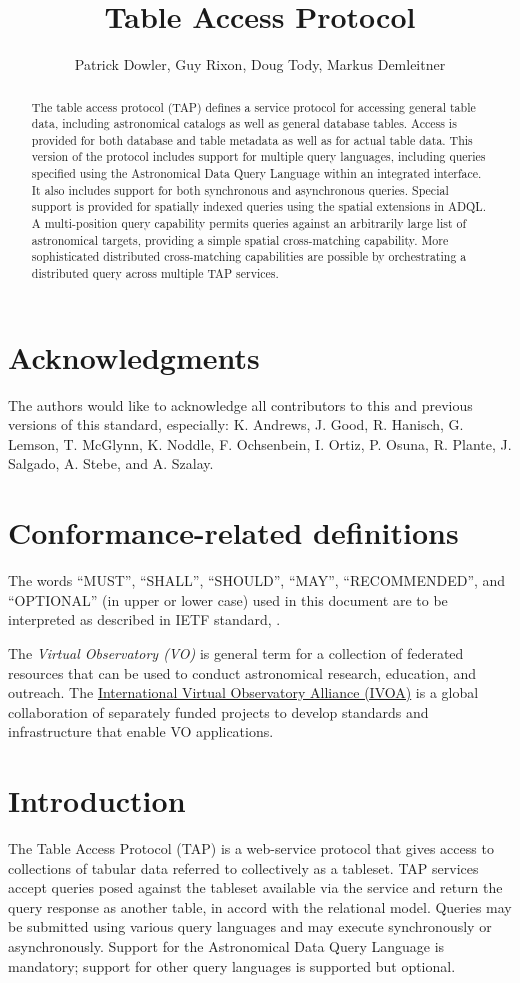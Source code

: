 \documentclass[11pt,letter]{ivoa}
\title{Table Access Protocol}
\author{Patrick Dowler, Guy Rixon, Doug Tody, Markus Demleitner}
\begin{document}
\begin{abstract}
The table access protocol (TAP) defines a service protocol for accessing general 
table data, including astronomical catalogs as well as general database tables. 
Access is provided for both database and table metadata as well as for actual 
table data. This version of the protocol includes support for multiple query 
languages, including queries specified using the Astronomical Data Query 
Language \citep{std:ADQL} within an integrated interface. It also includes 
support 
for both synchronous and asynchronous queries. Special support is provided for
spatially indexed queries using the spatial extensions in ADQL. A multi-position 
query capability permits queries against an arbitrarily large list of 
astronomical targets, providing a simple spatial cross-matching capability. 
More sophisticated distributed cross-matching capabilities are possible by 
orchestrating a distributed query across multiple TAP services.  
\end{abstract}


\section*{Acknowledgments}

The authors would like to acknowledge all contributors to this and previous 
versions of this standard, especially: K. Andrews, J. Good, R. Hanisch, G. 
Lemson, T. McGlynn, K. Noddle, F. Ochsenbein, I. Ortiz, P. Osuna, R. Plante, 
J. Salgado, A. Stebe, and A. Szalay.


\section*{Conformance-related definitions}

The words ``MUST'', ``SHALL'', ``SHOULD'', ``MAY'', ``RECOMMENDED'', and
``OPTIONAL'' (in upper or lower case) used in this document are to be
interpreted as described in IETF standard, \citet{std:RFC2119}.

The \emph{Virtual Observatory (VO)} is general term for a collection of 
federated resources that can be used to conduct astronomical research, 
education, and outreach. The \href{http://www.ivoa.net}{International
Virtual Observatory Alliance (IVOA)} is a global collaboration of separately 
funded projects to develop standards and infrastructure that enable VO 
applications.


\section{Introduction}
The Table Access Protocol (TAP) is a web-service protocol that gives access to 
collections of tabular data referred to collectively as a tableset.  TAP 
services accept queries posed against the tableset available via the service and 
return the query response as another table, in accord with the relational model. 
 Queries may be submitted using various query languages and may execute 
synchronously or asynchronously. Support for the Astronomical Data Query 
Language \citep{std:ADQL} is mandatory; support for other query languages is 
supported 
but optional.
\end{document}
